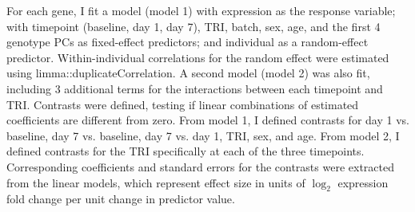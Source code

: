 For each gene, I fit a model (model 1) with expression as the response variable; with timepoint (baseline, day 1, day 7), \gls{TRI}, batch, sex, age, and the first 4 genotype \glspl{PC} as fixed-effect predictors; and individual as a random-effect predictor.
Within-individual correlations for the random effect were estimated using limma::duplicateCorrelation.
A second model (model 2) was also fit, including 3 additional terms for the interactions between each timepoint and \gls{TRI}.
%
Contrasts were defined, testing if linear combinations of estimated coefficients are different from zero.
From model 1, I defined contrasts for day 1 vs. baseline, day 7 vs. baseline, day 7 vs. day 1, \gls{TRI}, sex, and age.
From model 2, I defined contrasts for the \gls{TRI} specifically at each of the three timepoints.
%
Corresponding coefficients and standard errors for the contrasts were extracted from the linear models, which represent effect size in units of $\log_2$ expression fold change per unit change in predictor value.

